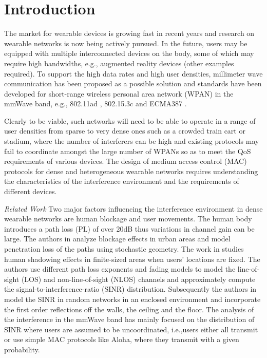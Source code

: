 \documentclass[10pt, conference, letterpaper]{IEEEtran}
\begin{document}
\section{Introduction}\label{section:introduction}

The market for wearable devices is growing fast in recent years \cite{wearable} and research on wearable networks is now being actively pursued. In the future, users may be equipped with multiple interconnected devices on the body, some of which may require high bandwidths, e.g., augmented reality devices (other examples required). To support the high data rates and high user densities, millimeter wave communication has been proposed as a possible solution and standards have been developed for short-range wireless personal area network (WPAN) in the mmWave band, e.g., 802.11ad \cite{80211ad}, 802.15.3c \cite{802153c} and ECMA387 \cite{ECMA387}. 

Clearly to be viable, such networks will need to be able to operate in a range of user densities from sparse to very dense ones such as a crowded train cart or stadium, where the number of interferers can be high and existing protocols may fail to coordinate amongst the large number of WPANs so as to meet the QoS requirements of various devices. The design of medium access control (MAC) protocols for dense and heterogeneous wearable networks requires understanding the characteristics of the interference environment and the requirements of different devices.

\emph{Related Work}
Two major factors influencing the interference environment in dense wearable networks are human blockage and user movements. The human body introduces a path loss (PL) of over 20dB \cite{humanshadowing} thus variations in channel gain can be large. The authors in \cite{urbanblockage} analyze blockage effects in urban areas and model penetration loss of the paths using stochastic geometry. The work in \cite{interferencefinitesized} studies human shadowing effects in finite-sized areas when users' locations are fixed. The authors use different path loss exponents and fading models to model the line-of-sight (LOS) and non-line-of-sight (NLOS) channels and approximately compute the signal-to-interference-ratio (SINR) distribution. Subsequently the authors in \cite{enclosedmmwave} model the SINR in random networks in an enclosed environment and incorporate the first order reflections off the walls, the ceiling and the floor. The analysis of the interference in the mmWave band has mainly focused on the distribution of SINR where users are assumed to be uncoordinated, i.e.,users  either all transmit or use simple MAC protocols like Aloha, where they transmit with a given probability. 
\end{document}
